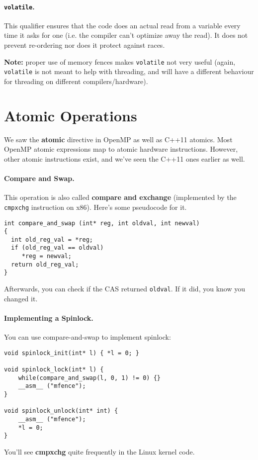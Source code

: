 \documentclass[11pt]{article}
\begin{document}
\paragraph{{\tt volatile}.} This qualifier ensures that the
code does an actual read from a variable every time it asks for one
(i.e. the compiler can't optimize away the read). It does not prevent
re-ordering nor does it protect against races.

{\bf Note:} proper use of memory fences makes {\tt volatile} not very
useful (again, {\tt volatile} is not meant to help with threading, and
will have a different behaviour for threading on different
compilers/hardware).

\section*{Atomic Operations}
 We saw the {\bf atomic} directive in OpenMP as well as C++11 atomics. Most OpenMP atomic expressions map to atomic hardware instructions.
However, other atomic instructions exist, and we've seen the C++11 ones earlier as well.

\paragraph{Compare and Swap.} This operation is also called {\bf compare and exchange} (implemented by the {\tt cmpxchg} instruction on x86).
Here's some pseudocode for it.
  \begin{lstlisting}
int compare_and_swap (int* reg, int oldval, int newval) 
{
  int old_reg_val = *reg;
  if (old_reg_val == oldval) 
     *reg = newval;
  return old_reg_val;
}
  \end{lstlisting}

Afterwards, you can check if the CAS returned {\tt oldval}. If it did, you know you changed it.

\newpage
\paragraph{Implementing a Spinlock.}
You can use compare-and-swap to implement spinlock:
  \begin{lstlisting}
void spinlock_init(int* l) { *l = 0; }

void spinlock_lock(int* l) {
    while(compare_and_swap(l, 0, 1) != 0) {}
    __asm__ ("mfence");
}

void spinlock_unlock(int* int) {
    __asm__ ("mfence");
    *l = 0;  
}
  \end{lstlisting}
You'll see {\bf cmpxchg} quite frequently in the Linux kernel code.
\end{document}
